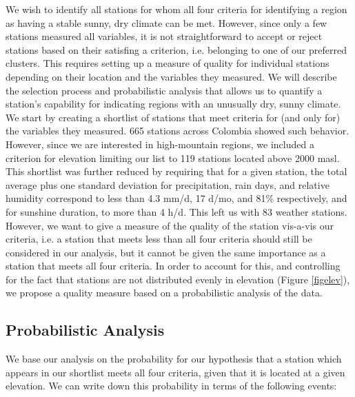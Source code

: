 \documentclass[12pt]{iopart}
\begin{document}
We wish to identify all stations for whom all four criteria for identifying a region as having a stable sunny, dry climate can be met.  However, since only a few stations measured all variables, it is not straightforward to accept or reject stations based on their satisfing a criterion, i.e. belonging to one of our preferred clusters. This requires setting up a measure of quality for individual stations depending on their location and the variables they measured. We will describe the selection process and probabilistic analysis that allows us to quantify a station's capability for indicating regions with an unusually dry, sunny climate.\\

We start by creating a shortlist of stations that meet criteria for (and only for) the variables they measured. 665 stations across Colombia showed such behavior. However, since we are interested in high-mountain regions, we included a criterion for elevation limiting our list to 119 stations located above 2000 masl. This shortlist was further reduced by requiring that for a given station, the total average plus one  standard deviation for precipitation, rain days, and relative humidity correspond to less than 4.3 mm/d, 17 d/mo, and 81\% respectively, and for sunshine duration, to more than 4 h/d. This left us with 83 weather stations. \\

However, we want to give a measure of the quality of the station vis-a-vis our criteria, i.e. a station that meets less than all four criteria should still be considered in our analysis, but it cannot be given the same importance as a station that meets all four criteria. In order to account for this, and controlling for the fact that stations are not distributed evenly in elevation (Figure \ref{figelev}), we propose a quality measure based on a probabilistic analysis of the data.

\subsection{Probabilistic Analysis}

We base our analysis on the probability for our hypothesis that a station which appears in our shortlist meets all four criteria, given that it is located at a given elevation. We can write down this probability in terms of the following events:
\end{document}
